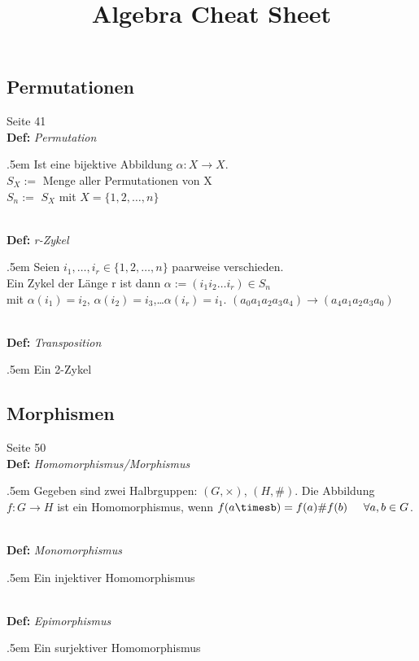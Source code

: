 \documentclass[twocolumn, 10pt]{article}
\newenvironment {definition}
                [1][]
                {\noindent\\{\bf
                Def:}\emph{
                #1}\indent\begin{addmargin}{.5em}}{\end{addmargin}}
\begin{document}
\title{Algebra Cheat Sheet}
\maketitle



\subsection*{Permutationen}

{\tiny Seite 41}
\begin{definition}[Permutation]
Ist eine bijektive Abbildung $\alpha :X\rightarrow X$.\\
$S_X := $ Menge aller Permutationen von X\\
$S_n := $ $S_X$ mit $X=\{1, 2,\ldots ,n\}$
\end{definition}

\begin{definition}[r-Zykel]
Seien $i_1,\ldots ,i_r \in \{1, 2,\ldots ,n\}$ paarweise verschieden.\\
Ein Zykel der Länge r ist dann $\alpha :=(i_1i_2\ldots i_r) \in S_n$ \\mit
$\alpha (i_1)=i_2$, $\alpha (i_2)=i_3$,\ldots $\alpha (i_r)=i_1$.
$(a_0a_1a_2a_3a_4) \rightarrow (a_4a_1a_2a_3a_0)$
\end{definition}

\begin{definition}[Transposition]
Ein 2-Zykel
\end{definition}



\subsection*{Morphismen}

{\tiny Seite 50}
\begin{definition}[Homomorphismus/Morphismus]
Gegeben sind zwei Halbrguppen: $(G, \times )$, $(H, \# )$. Die Abbildung
$f:G \rightarrow H$ ist ein Homomorphismus, wenn
$f(a\timesb )=f(a)\# f(b)\hspace{.5cm}\forall a,b \in G$.
\end{definition}

\begin{definition}[Monomorphismus]
Ein injektiver Homomorphismus
\end{definition}

\begin{definition}[Epimorphismus]
Ein surjektiver Homomorphismus
\end{definition}
\end{document}
